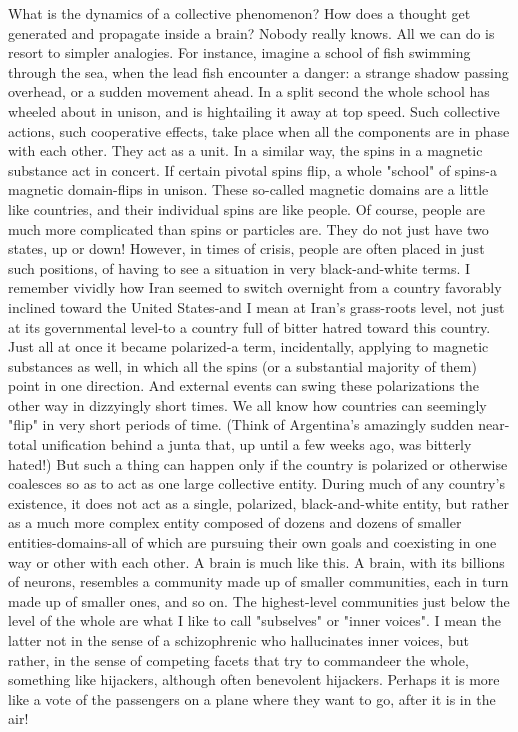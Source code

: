         What is the dynamics of a collective phenomenon? How does a thought get
generated and propagate inside a brain? Nobody really knows. All we can do is resort
to simpler analogies. For instance, imagine a school of fish swimming through the
sea, when the lead fish encounter a danger: a strange shadow passing overhead, or a
sudden movement ahead. In a split second the whole school has wheeled about in
unison, and is hightailing it away at top speed. Such collective actions, such
cooperative effects, take place when all the components are in phase with each other.
They act as a unit. In a similar way, the spins in a magnetic substance act in concert.
If certain pivotal spins flip, a whole "school" of spins-a magnetic domain-flips in
unison.
        These so-called magnetic domains are a little like countries, and their
individual spins are like people. Of course, people are much more complicated than
spins or particles are. They do not just have two states, up or down! However, in
times of crisis, people are often placed in just such positions, of having to see a
situation in very black-and-white terms. I remember vividly how Iran seemed to
switch overnight from a country favorably inclined toward the United States-and I
mean at Iran's grass-roots level, not just at its governmental level-to a country full of
bitter hatred toward this country. Just all at once it became polarized-a term,
incidentally, applying to magnetic substances as well, in which all the spins (or a
substantial majority of them) point in one direction.
        And external events can swing these polarizations the other way in dizzyingly
short times. We all know how countries can seemingly "flip" in very short periods of
time. (Think of Argentina's amazingly sudden near-total unification behind a junta
that, up until a few weeks ago, was bitterly hated!) But such a thing can happen only
if the country is polarized or otherwise coalesces so as to act as one large collective
entity. During much of any country's existence, it does not act as a single, polarized,
black-and-white entity, but rather as a much more complex entity composed of dozens
and dozens of smaller entities-domains-all of which are pursuing their own goals and
coexisting in one way or other with each other.
        A brain is much like this. A brain, with its billions of neurons, resembles a
community made up of smaller communities, each in turn made up of smaller ones,
and so on. The highest-level communities just below the level of the whole are what I
like to call "subselves" or "inner voices". I mean the latter not in the sense of a
schizophrenic who hallucinates inner voices, but rather, in the sense of competing
facets that try to commandeer the whole, something like hijackers, although often
benevolent hijackers. Perhaps it is more like a vote of the passengers on a plane where
they want to go, after it is in the air!




